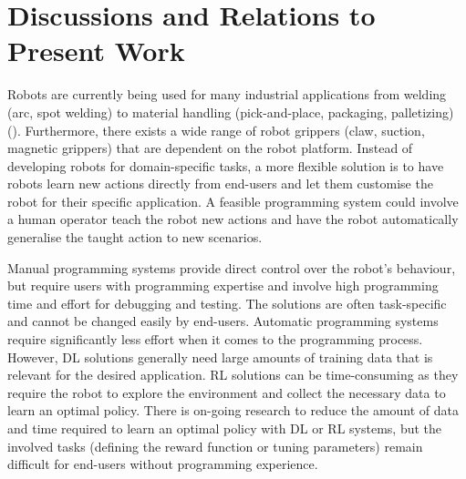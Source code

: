 \section{Discussions and Relations to Present Work}\label{sota-discussions}
Robots are currently being used for many industrial applications from welding (\eg arc, spot welding) to material handling (\eg pick-and-place, packaging, palletizing) (\cite{technavio}).
Furthermore, there exists a wide range of robot grippers (\eg claw, suction, magnetic grippers) that are dependent on the robot platform.
Instead of developing robots for domain-specific tasks, a more flexible solution is to have robots learn new actions directly from end-users and let them customise the robot for their specific application.
A feasible programming system could involve a human operator teach the robot new actions and have the robot automatically generalise the taught action to new scenarios.

Manual programming systems provide direct control over the robot's behaviour, but require users with programming expertise and involve high programming time and effort for debugging and testing.
The solutions are often task-specific and cannot be changed easily by end-users.
Automatic programming systems require significantly less effort when it comes to the programming process. 
However, DL solutions generally need large amounts of training data that is relevant for the desired application.
RL solutions can be time-consuming as they require the robot to explore the environment and collect the necessary data to learn an optimal policy.
There is on-going research to reduce the amount of data and time required to learn an optimal policy with DL or RL systems, but the involved tasks (\eg defining the reward function or tuning parameters) remain difficult for end-users without programming experience. %

